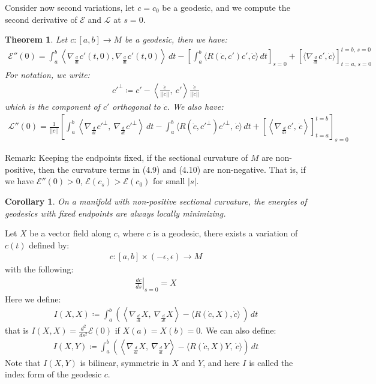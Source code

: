 \documentclass[11pt]{book}
\theoremstyle{break}
\theoremstyle{break}
\newtheorem{thm}{Theorem}[section]
\newtheorem{corT}[lem]{Corollary}
\newcommand{\remark}{\color{blue}Remark: \color{black}}
\begin{document}
\hfill\break
Consider now second variations, let $c= c_0$ be a geodesic, and we compute the second derivative of $\mathcal{E}$ and $\mathcal{L}$ at $s = 0$.
\begin{thm}
Let $c:[a,b] \to M$ be a geodesic, then we have:
\begin{align}
\mathcal{E}''(0) = \int_a^b \left\langle 
\nabla_{\frac{d}{dt}}c'(t,0), \nabla_{\frac{d}{dt}}c'(t,0)\right\rangle \, dt- \left[\int_a^b \langle R(\dot{c},c')c', \dot{c}\rangle \, dt\right]_{s=0} + \left[\langle \nabla_{\frac{d}{dt}}c',\dot{c}\rangle\right]_{t=a,\, s=0}^{t=b,\, s=0}
\end{align}
For notation, we write:
\begin{align*}
{c'}^\perp \coloneqq c' -\left\langle \frac{\dot{c}}{||\dot{c}||}, \ c'\right\rangle \frac{\dot{c}}{||\dot{c}||}
\end{align*}
which is the component of $c'$ orthogonal to $\dot{c}$. We also have:
\begin{align}
\mathcal{L}''(0) = \frac{1}{||\dot{c}||}\left[ \int_a^b \left\langle
\nabla_{\frac{d}{dt}}{c'}^{\perp}, \ \nabla_{\frac{d}{dt}}{c'}^{\perp}\right\rangle \, dt
- \int_a^b \langle R(\dot{c}, {c'}^{\perp}) {c'}^{\perp},\, \dot{c}\rangle \, dt + \left[\left\langle \nabla_{\frac{d}{ds}}c',\, \dot{c}\right\rangle\right]_{t=a}^{t=b}\right]_{s=0}
\end{align}
\end{thm}
\remark Keeping the endpoints fixed, if the sectional curvature of $M$ are non-positive, then the curvature terms in (4.9) and (4.10) are non-negative. That is, if we have $\mathcal{E}''(0) > 0$, $\mathcal{E}(c_s) > \mathcal{E}(c_0)$ for small $|s|$.\\

\begin{corT}
On a manifold with non-positive sectional curvature, the energies of geodesics with fixed endpoints are always locally minimizing. 
\end{corT}

Let $X$ be a vector field along $c$, where $c$ is a geodesic, there exists a variation of $c(t)$ defined by:
\begin{align*}
c:[a,b] \times (-\epsilon,\epsilon) \to M
\end{align*}
with the following:
\begin{align*}
\left.\frac{dc}{ds}\right|_{s=0} = X
\end{align*}
Here we define:
\begin{align*}
I(X,X) \coloneqq \int_a^b \left( \left\langle \nabla_{\frac{d}{dt}}X, \ \nabla_{\frac{d}{dt}}X\right\rangle - \langle R(\dot{c}, X), \dot{c}\rangle \, \right)\, dt 
\end{align*}
that is $I(X,X) = \frac{d^2}{ds^2}\mathcal{E}(0)$ if $X(a) = X(b) = 0$. We can also define:
\begin{align*}
I(X,Y) \coloneqq \int_a^b  \left( \left\langle \nabla_{\frac{d}{dt}}X,\ \nabla_{\frac{d}{dt}}Y \right\rangle - \langle R(\dot{c},X)Y,\ \dot{c}\rangle\right) \, dt
\end{align*}
Note that $I(X,Y)$ is bilinear, symmetric in $X$ and $Y$, and here $I$ is called the index form of the geodesic $c$. \\
\end{document}
